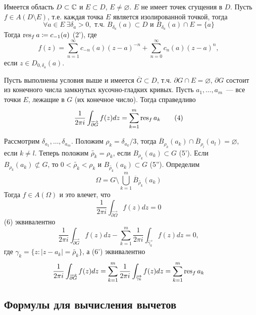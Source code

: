 \documentclass[main]{subfiles}
\begin{document}
Имеется область $D \subset \mathbb{C}$ и $E \subset D$, $E \neq \varnothing$.
$E$ не имеет точек сгущения в $D$.
Пусть $f \in A(D \setminus E)$, т.е. каждая точка $E$ является изолированной точкой, тогда
\[\forall a \in E\ \exists \delta_a > 0, \text{ т.ч. } B_{\delta_a} (a) \subset D \text{ и } B_{\delta_a}(a) \cap E = \{a\} \tag{3}\]
Тогда $\operatorname{res}_f a \coloneq c_{-1}(a)$ (2'), где
\[f(z) = \sum_{n=1}^{\infty} c_{-n}(a) (z-a)^{-n} + \sum_{n=0}^{\infty} c_{n}(a) (z-a)^n, \tag{2''}\]
если $z \in D_{0, \delta_a}(a)$.

\begin{theorem}[о вычетах]
    Пусть выполнены условия выше и имеется $\overline{G} \subset D$, т.ч. $\partial G \cap E = \varnothing$, $\partial G$ состоит из конечного числа замкнутых кусочно-гладких кривых.
    Пусть $a_1, \dotsc, a_m$~--- все точки $E$, лежащие в $G$ (их конечное число).
    Тогда справедливо
    \begin{gather*}
        \frac{1}{2 \pi i} \int_{\overrightarrow{\partial G}} f(z) dz = \sum_{k=1}^{m} \operatorname{res}_f a_k \tag{4}
    \end{gather*}
\end{theorem}
\begin{longProof}
    Рассмотрим $\delta_{a_1},\dotsc,\delta_{a_m}$.
    Положим $\rho_k = \delta_{a_k} /3$, тогда $\overline{B}_{\rho_k} (a_k) \cap \overline{B}_{\rho_l} (a_l) = \varnothing$, если $k \neq l$.
    Теперь положим $\widetilde{\rho_k} = \rho_k$, если $B_{\rho_k}(a_k) \subset G$ (5').
    Если $B_{\rho_k}(a_k) \not\subset G$, то $0 < \widetilde{\rho_k} < \rho_k$ и $B_{\widetilde{\rho_k}}(a_k) \subset G$ (5'').
    Определим
    \[\Omega = G \setminus \bigcup_{k=1}^m \overline{B}_{\widetilde{\rho_k}}(a_k)\]
    Тогда $f \in A(\Omega)$ и это влечет, что
    \[\frac{1}{2 \pi i} \int_{\overrightarrow{\partial \Omega}} f(z) dz = 0 \tag{6}\]
    (6) эквивалентно
    \[\frac{1}{2 \pi i} \int_{\overrightarrow{\partial G}} f(z) dz - \sum_{k=1}^{m} \frac{1}{2 \pi i} \int_{\overrightarrow{\gamma_k}} f(z) dz = 0, \tag{6'}\]
    где $\gamma_k = \{z: |z-a_k| = \widetilde{\rho_k}\}$, а (6') эквивалентно
    \[\frac{1}{2 \pi i} \int_{\overrightarrow{\partial G}} f(z) dz = \sum_{k=1}^{m} \frac{1}{2 \pi i} \int_{\overrightarrow{\gamma_k}} f(z) dz = \sum_{k=1}^{m} \operatorname{res}_f a_k\]
\end{longProof}

\subsection{Формулы для вычисления вычетов}
\end{document}
